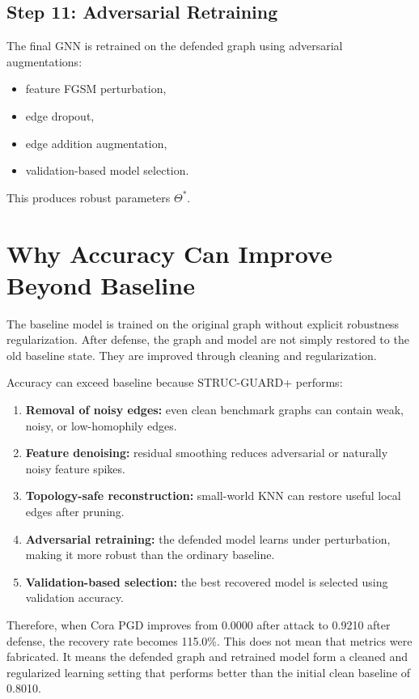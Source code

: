 \documentclass[12pt,a4paper]{article}
\begin{document}
\subsection{Step 11: Adversarial Retraining}
The final GNN is retrained on the defended graph using adversarial augmentations:

\begin{itemize}
    \item feature FGSM perturbation,
    \item edge dropout,
    \item edge addition augmentation,
    \item validation-based model selection.
\end{itemize}

This produces robust parameters $\Theta^*$.

\section{Why Accuracy Can Improve Beyond Baseline}

The baseline model is trained on the original graph without explicit robustness regularization. After defense, the graph and model are not simply restored to the old baseline state. They are improved through cleaning and regularization.

Accuracy can exceed baseline because STRUC-GUARD+ performs:

\begin{enumerate}
    \item \textbf{Removal of noisy edges:} even clean benchmark graphs can contain weak, noisy, or low-homophily edges.
    \item \textbf{Feature denoising:} residual smoothing reduces adversarial or naturally noisy feature spikes.
    \item \textbf{Topology-safe reconstruction:} small-world KNN can restore useful local edges after pruning.
    \item \textbf{Adversarial retraining:} the defended model learns under perturbation, making it more robust than the ordinary baseline.
    \item \textbf{Validation-based selection:} the best recovered model is selected using validation accuracy.
\end{enumerate}

Therefore, when Cora PGD improves from 0.0000 after attack to 0.9210 after defense, the recovery rate becomes 115.0\%. This does not mean that metrics were fabricated. It means the defended graph and retrained model form a cleaned and regularized learning setting that performs better than the initial clean baseline of 0.8010.
\end{document}
